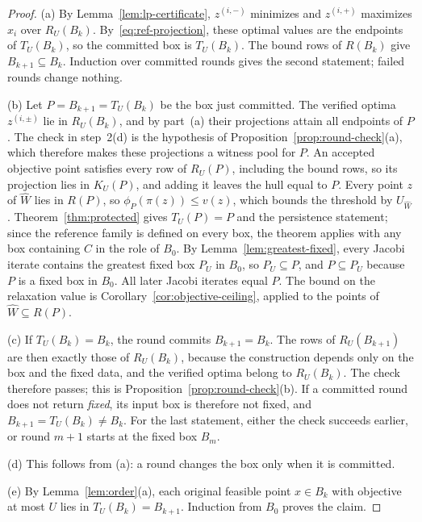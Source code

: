 \begin{proof}
(a) By Lemma~\ref{lem:lp-certificate}, $z^{(i,-)}$ minimizes and $z^{(i,+)}$
maximizes $x_i$ over $R_U(B_k)$. By~\eqref{eq:ref-projection}, these optimal
values are the endpoints of $T_U(B_k)$, so the committed box is $T_U(B_k)$.
The bound rows of $R(B_k)$ give $B_{k+1}\subseteq B_k$. Induction over
committed rounds gives the second statement; failed rounds change nothing.

(b) Let $P=B_{k+1}=T_U(B_k)$ be the box just committed. The verified optima
$z^{(i,\pm)}$ lie in $R_U(B_k)$, and by part~(a) their projections attain all
endpoints of $P$. The check in step~2(d) is the hypothesis of
Proposition~\ref{prop:round-check}(a), which therefore makes these
projections a witness pool for $P$. An accepted objective point satisfies
every row of $R_U(P)$, including the bound rows, so its projection lies in
$K_U(P)$, and adding it leaves the hull equal to $P$. Every point $z$ of
$\widehat W$ lies in $R(P)$, so $\phi_P(\pi(z))\le v(z)$, which bounds the
threshold by $U_{\widehat W}$. Theorem~\ref{thm:protected} gives $T_U(P)=P$
and the persistence statement; since the reference family is defined on
every box, the theorem applies with any box containing $C$ in the role of
$B_0$. By Lemma~\ref{lem:greatest-fixed}, every Jacobi iterate contains the
greatest fixed box $P_U$ in $B_0$, so $P_U\subseteq P$, and $P\subseteq P_U$
because $P$ is a fixed box in $B_0$. All later Jacobi iterates equal $P$.
The bound on the relaxation value is Corollary~\ref{cor:objective-ceiling},
applied to the points of $\widehat W\subseteq R(P)$.

(c) If $T_U(B_k)=B_k$, the round commits $B_{k+1}=B_k$. The rows of
$R_U(B_{k+1})$ are then exactly those of $R_U(B_k)$, because the construction
depends only on the box and the fixed data, and the verified optima belong to
$R_U(B_k)$. The check therefore passes; this is
Proposition~\ref{prop:round-check}(b). If a committed round does not return
\emph{fixed}, its input box is therefore not fixed, and
$B_{k+1}=T_U(B_k)\ne B_k$. For the last statement, either the check succeeds
earlier, or round $m+1$ starts at the fixed box $B_m$.

(d) This follows from (a): a round changes the box only when it is committed.

(e) By Lemma~\ref{lem:order}(a), each original feasible point $x\in B_k$ with
objective at most $U$ lies in $T_U(B_k)=B_{k+1}$. Induction from $B_0$ proves
the claim.
\end{proof}

